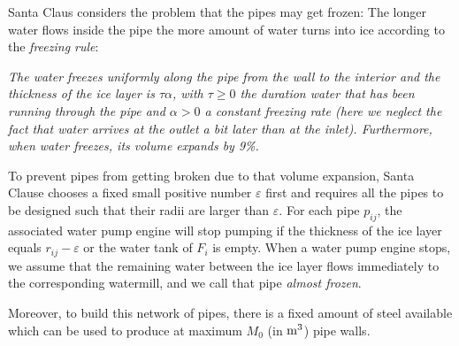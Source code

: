 \documentclass[12pt]{article}
\begin{document}
\begin{center}
\end{center}


Santa Claus considers the problem that the pipes may get frozen: The longer water flows inside the pipe the more amount of water turns into ice according to the \emph{freezing rule}:

\smallskip
\emph{ The water freezes uniformly along the pipe from the wall to the interior and the thickness of the ice layer is $\tau \alpha$, with $\tau\ge 0$ the duration water that has been running through the pipe and $\alpha > 0$ a constant \textit{freezing rate} (here we neglect the fact that water arrives at the outlet a bit later than at the inlet). Furthermore, when water freezes, its volume expands by 9\%.}

\smallskip
To prevent pipes from getting broken due to that volume expansion, Santa Clause chooses a fixed small positive number $\varepsilon$ first and requires all the pipes to be designed such that their radii are larger than $\varepsilon$. For each pipe $p_{ij}$, the associated water pump engine will stop pumping if the thickness of the ice layer equals $r_{ij} - \varepsilon$ or the water tank of $F_i$ is empty. When a water pump engine stops, we assume that the remaining water between the ice layer flows immediately to the corresponding watermill, and we call that pipe \emph{almost frozen}.

Moreover, to build this network of pipes, there is a fixed amount of steel available which can be used to produce at maximum $M_0$ (in $\rm m^3$) pipe walls.
\end{document}
